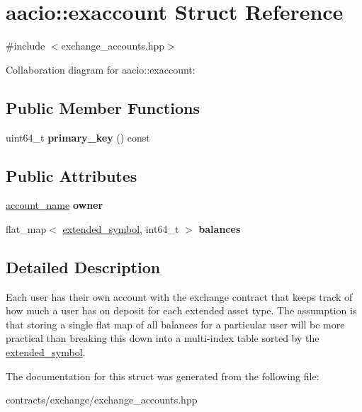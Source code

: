 \hypertarget{structaacio_1_1exaccount}{}\section{aacio\+:\+:exaccount Struct Reference}
\label{structaacio_1_1exaccount}


{\ttfamily \#include $<$exchange\+\_\+accounts.\+hpp$>$}



Collaboration diagram for aacio\+:\+:exaccount\+:
\subsection*{Public Member Functions}
\begin{DoxyCompactItemize}
\item 
\mbox{\label{structaacio_1_1exaccount_ab2f2f29ae2b9fe125a1d26babe0740e0}} 
uint64\+\_\+t {\bfseries primary\+\_\+key} () const
\end{DoxyCompactItemize}
\subsection*{Public Attributes}
\begin{DoxyCompactItemize}
\item 
\mbox{\label{structaacio_1_1exaccount_ab063059c5a913f6685b7f29bf891ad15}} 
\mbox{\hyperlink{structaacio_1_1chain_1_1name}{account\+\_\+name}} {\bfseries owner}
\item 
\mbox{\label{structaacio_1_1exaccount_a432857b2538686a35cc7512b6e796cb6}} 
flat\+\_\+map$<$ \mbox{\hyperlink{structaacio_1_1extended__symbol}{extended\+\_\+symbol}}, int64\+\_\+t $>$ {\bfseries balances}
\end{DoxyCompactItemize}


\subsection{Detailed Description}
Each user has their own account with the exchange contract that keeps track of how much a user has on deposit for each extended asset type. The assumption is that storing a single flat map of all balances for a particular user will be more practical than breaking this down into a multi-\/index table sorted by the \mbox{\hyperlink{structaacio_1_1extended__symbol}{extended\+\_\+symbol}}. 

The documentation for this struct was generated from the following file\+:\begin{DoxyCompactItemize}
\item 
contracts/exchange/exchange\+\_\+accounts.\+hpp\end{DoxyCompactItemize}
